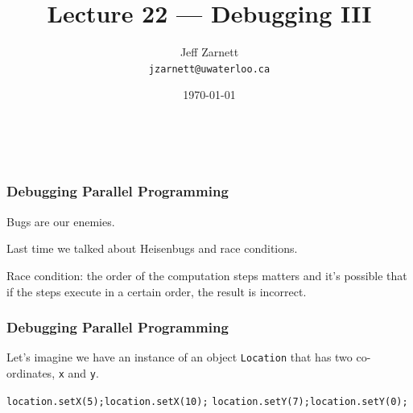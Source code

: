 
\usepackage{alltt}

\title{Lecture 22 --- Debugging III }

\author{Jeff Zarnett \\ \small \texttt{jzarnett@uwaterloo.ca}}
\date{\today}



\begin{frame}
  \titlepage

  \vfill
  \begin{center}
    \\
                  {\tiny\CcNote{\CcLongnameByNcSa}}
                  \vspace*{-2.5ex}
  \end{center}

\end{frame}

\begin{frame}
\frametitle{Debugging Parallel Programming}
\begin{changemargin}{1cm}
Bugs are our enemies.

Last time we talked about Heisenbugs and race conditions.

Race condition: the order of the computation steps matters and it's possible that if the steps execute in a certain order, the result is incorrect.

\end{changemargin}
\end{frame}


\begin{frame}
\frametitle{Debugging Parallel Programming}
\begin{changemargin}{1cm}

Let's imagine we have an instance of an object \texttt{Location} that has two co-ordinates, \texttt{x} and \texttt{y}. 


\texttt{location.setX(5);\quad\quad location.setX(10);}
\texttt{location.setY(7);\quad\quad location.setY(0);}

\end{changemargin}
\end{frame}

